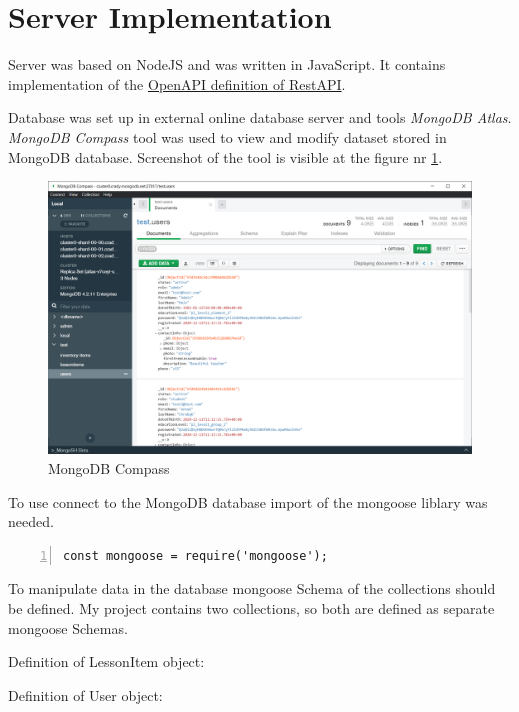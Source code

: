 \section{Server Implementation}

Server was based on NodeJS and was written in JavaScript. It contains implementation of the \hyperref[sec:appendix_a]{OpenAPI definition of RestAPI}. 

Database was set up in external online database server and tools \textit{MongoDB Atlas}. \textit{MongoDB Compass} tool was used to view and modify dataset stored in MongoDB database. Screenshot of the tool is visible at the figure nr \ref{fig:MongoDBCompass}.

\begin{figure}[h]
    \centering
    \includegraphics[width=\textwidth]{Include/Resources/MongoDB/MongoDBCompass.png}
    \caption{MongoDB Compass}
    \label{fig:MongoDBCompass}
\end{figure}

To use connect to the MongoDB database import of the mongoose liblary was needed.
\begin{lstlisting}[breaklines=true, numbers=left, stepnumber=1]
const mongoose = require('mongoose');
\end{lstlisting}

To manipulate data in the database mongoose Schema of the collections should be defined. My project contains two collections, so both are defined as separate mongoose Schemas.

Definition of LessonItem object:


Definition of User object:


